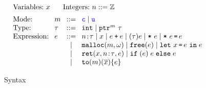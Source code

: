 \begin{figure}
  \small \centering
  \[ \hspace*{-1.5em}
\setlength{\arraycolsep}{4pt}
\begin{array}{l}
\begin{array}{ll}
       \text{Variables:}~ x
& \quad\text{Integers:}~n::=\mathbb{Z} 
\end{array}
\\[0.5em]
\begin{array}{llcllcl}
\text{Mode:} & m & ::= & \cmode \mid \umode \\
     \text{Type:}& \tau &::=& \tint\mid \tptr{\tau}{ m}
\\
\text{Expression:}& e & ::= & 
\evalue{n}{\tau} \mid x \mid \ebinop{e}{e}\mid \ecast{\tau}{e} \mid\estar{e}\mid\eassign{e}{e}
  \\
&&\mid& \emalloc{m}{\omega} \mid \efree{e} \mid \elet{x}{e}{e}   \\
&&\mid& \ret{x}{\evalue{n}{\tau}}{e} \mid \eif{e}{e}{e} \\
&&\mid&\toa{m}{\overline{x}}{e}
\end{array}
    \end{array}
  \]
  \caption{\lang Syntax}
  \label{fig:checkc-syn}
\end{figure}


